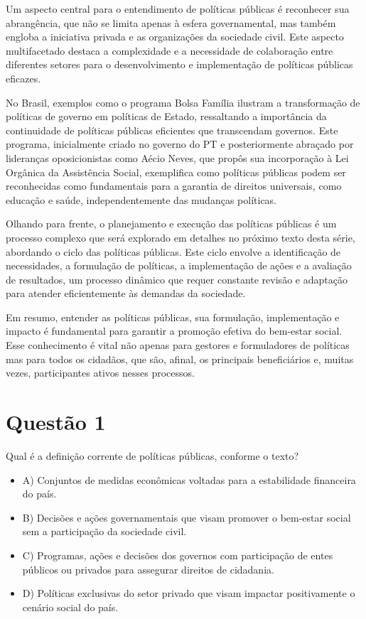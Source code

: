 \documentclass[
   article,       
   12pt,          
   oneside,       
   a4paper,       
   english,       
   brazil,        
   sumario=tradicional
   ]{abntex2}
\begin{document}
Um aspecto central para o entendimento de políticas públicas é reconhecer sua abrangência, que não se limita apenas à esfera governamental, mas também engloba a iniciativa privada e as organizações da sociedade civil. Este aspecto multifacetado destaca a complexidade e a necessidade de colaboração entre diferentes setores para o desenvolvimento e implementação de políticas públicas eficazes.

No Brasil, exemplos como o programa Bolsa Família ilustram a transformação de políticas de governo em políticas de Estado, ressaltando a importância da continuidade de políticas públicas eficientes que transcendam governos. Este programa, inicialmente criado no governo do PT e posteriormente abraçado por lideranças oposicionistas como Aécio Neves, que propôs sua incorporação à Lei Orgânica da Assistência Social, exemplifica como políticas públicas podem ser reconhecidas como fundamentais para a garantia de direitos universais, como educação e saúde, independentemente das mudanças políticas.

Olhando para frente, o planejamento e execução das políticas públicas é um processo complexo que será explorado em detalhes no próximo texto desta série, abordando o ciclo das políticas públicas. Este ciclo envolve a identificação de necessidades, a formulação de políticas, a implementação de ações e a avaliação de resultados, um processo dinâmico que requer constante revisão e adaptação para atender eficientemente às demandas da sociedade.

Em resumo, entender as políticas públicas, sua formulação, implementação e impacto é fundamental para garantir a promoção efetiva do bem-estar social. Esse conhecimento é vital não apenas para gestores e formuladores de políticas mas para todos os cidadãos, que são, afinal, os principais beneficiários e, muitas vezes, participantes ativos nesses processos.
\section{Questão 1}
Qual é a definição corrente de políticas públicas, conforme o texto?
\begin{itemize}
    \item {A) Conjuntos de medidas econômicas voltadas para a estabilidade financeira do país.}
    \item {B) Decisões e ações governamentais que visam promover o bem-estar social sem a participação da sociedade civil.}
    \item {C) Programas, ações e decisões dos governos com participação de entes públicos ou privados para assegurar direitos de cidadania.}
    \item {D) Políticas exclusivas do setor privado que visam impactar positivamente o cenário social do país.}
\end{itemize}
\end{document}
